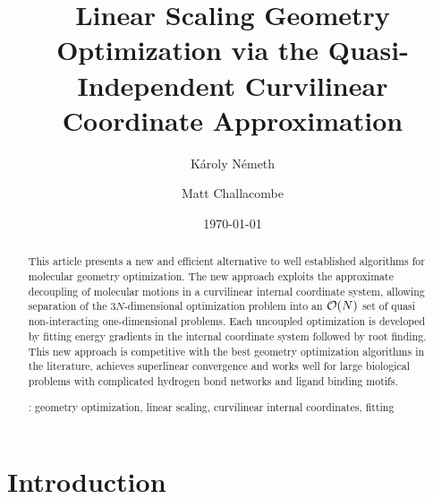 \documentclass[prl,twocolumn,showpacs,twocolumngrid,superbib]{revtex4}
\begin{document}
\title{Linear Scaling Geometry Optimization via the Quasi- \\ 
       Independent Curvilinear Coordinate Approximation\footnotemark[1]}

\author{K\'aroly N\'emeth\footnotemark[2]}
\author{Matt Challacombe}


\date{\today}

\begin{abstract}
{
This article presents a new and efficient alternative to well established
algorithms for molecular geometry optimization.   The new approach 
exploits the approximate decoupling of 
molecular motions
in a curvilinear 
internal coordinate system,  allowing separation  of the 3$N$-dimensional
optimization problem into an ${\cal{O}}(N)$ set of quasi non-interacting
one-dimensional problems.  Each  uncoupled optimization is developed by fitting 
energy gradients in the internal coordinate system followed by root finding.  
This new approach is competitive with the best geometry optimization algorithms 
in the literature, achieves superlinear convergence and works well for large 
biological problems with complicated hydrogen bond networks and ligand binding 
motifs.}

\smallskip
{}: 
geometry optimization, linear scaling, 
curvilinear internal coordinates, fitting
\end{abstract}

\maketitle


\section{Introduction}
\end{document}
